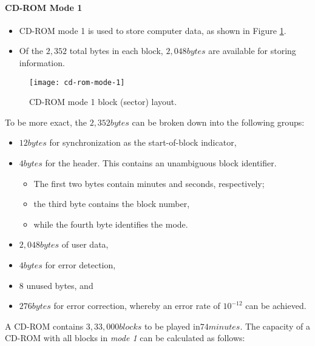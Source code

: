 \paragraph*{CD-ROM Mode 1}
\begin{itemize}
	\item CD-ROM mode 1 is used to store computer data, as shown in Figure {\ref{fig:cd-rom-mode-1}}. 
	\item Of the $ 2,352 $ total bytes in each block, $ 2,048 bytes $ are available for storing information.
\end{itemize}

\begin{figure}[H]
	\centering
	\texttt{[image: cd-rom-mode-1]}
	\caption[CD-ROM mode 1]{CD-ROM mode 1 block (sector) layout.}{\label{fig:cd-rom-mode-1}}
\end{figure}
To be more exact, the $ 2,352 bytes $ can be broken down into the following groups:

\begin{itemize}
	\item $ 12 bytes $ for synchronization as the start-of-block indicator,
	\item $ 4 bytes $ for the header. This contains an unambiguous block identifier.
	\begin{itemize}
		\item The first	two bytes contain minutes and seconds, respectively; 
		\item the third byte contains the block number, 
		\item while the fourth byte identifies the mode.
	\end{itemize}
	
	\item $ 2,048 bytes $ of user data,
	\item $ 4 bytes $ for error detection,
	\item $ 8 $ unused bytes, and
	\item $ 276 bytes $ for error correction, whereby an error rate of $ 10^{-12} $ can be achieved.
\end{itemize}

A CD-ROM contains $ 3,33,000 blocks $ to be played in$  74 minutes $. The capacity of a CD-ROM with all blocks in \textit{mode 1} can be calculated as follows:

